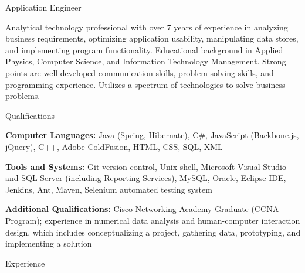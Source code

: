 



\vspace{1mm}

\begin{Large}\textsf{Application Engineer}\end{Large} \vspace{-2mm}

\begin{itemize1}
	\item Analytical technology professional with over 7 years of experience in analyzing business requirements, optimizing application usability, manipulating data stores, and implementing program functionality.  Educational background in Applied Physics, Computer Science, and Information Technology Management. Strong points are well-developed communication skills, problem-solving skills, and programming experience. Utilizes a spectrum of technologies to solve business problems.
\end{itemize1}

\begin{Large}\textsf{Qualifications}\end{Large} \vspace{-2mm}

\begin{itemize1}
	\item \textbf{Computer Languages:} Java (Spring, Hibernate), C\#, JavaScript (Backbone.js, jQuery), C++, Adobe ColdFusion, HTML, CSS, SQL, XML \vspace{2mm}
	\item \textbf{Tools and Systems:} Git version control, Unix shell, Microsoft Visual Studio and SQL Server (including Reporting Services), MySQL, Oracle, Eclipse IDE, Jenkins, Ant, Maven, Selenium automated testing system \vspace{2mm}
	\item \textbf{Additional Qualifications:} Cisco Networking Academy Graduate (CCNA Program); experience in numerical data analysis and human-computer interaction design, which includes conceptualizing a project, gathering data, prototyping, and implementing a solution
\end{itemize1}

\begin{Large}\textsf{Experience}\end{Large} \vspace{-2mm}

